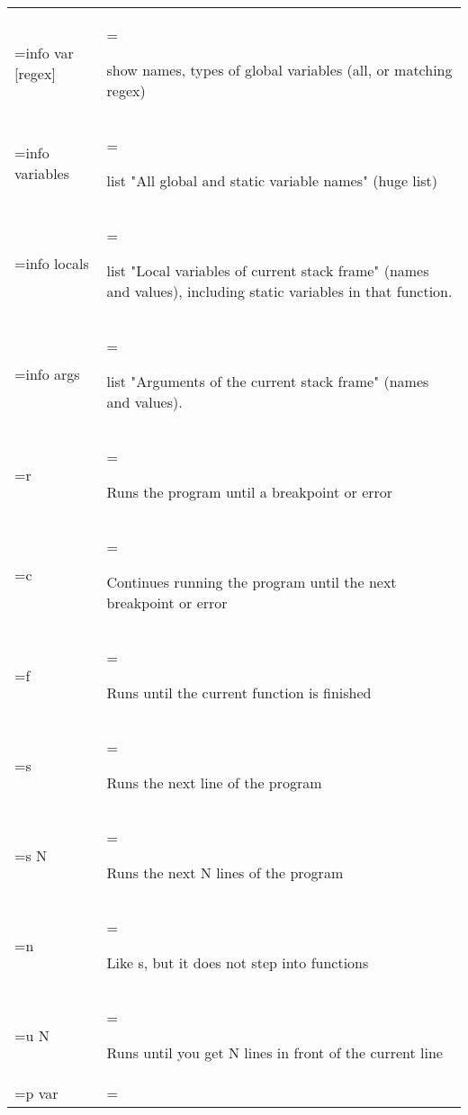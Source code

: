 \begin{table}[htbp]
\begin{tabularx}{\textwidth}{
            >{\hsize=0.20\hsize\linewidth=\hsize}X
            >{\hsize=0.80\hsize\linewidth=\hsize}X}
        info var [regex] &

        show names, types of global variables (all, or matching regex)   \\

        info variables   &

        list "All global and static variable names" (huge list)          \\

        info locals      &

        list "Local variables of current stack frame" (names and values), including
        static variables in that function.                               \\

        info args        &

        list "Arguments of the current stack frame" (names and values).  \\

        r                &

        Runs the program until a breakpoint or error                     \\

        c                &

        Continues running the program until the next breakpoint or error \\

        f                &

        Runs until the current function is finished                      \\

        s                &

        Runs the next line of the program                                \\

        s N              &

        Runs the next N lines of the program                             \\

        n                &

        Like s, but it does not step into functions                      \\

        u N              &

        Runs until you get N lines in front of the current line          \\

        p var            &


\end{tabularx}
\end{table}
